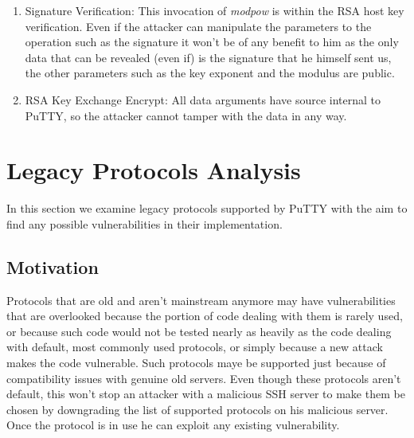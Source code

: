 \documentclass{bhamthesis}
\begin{document}
\begin{enumerate}
\begin{enumerate}
            \item{Signature Verification}: This invocation of \textit{modpow} is within the RSA host key verification. Even if the attacker can manipulate the parameters to the operation such as the signature it won't be of any benefit to him as the only data that can be revealed (even if) is the signature that he himself sent us, the other parameters such as the key exponent and the modulus are public.
            \item{RSA Key Exchange Encrypt}: All data arguments have source internal to PuTTY, so the attacker cannot tamper with the data in any way.
         \end{enumerate}   
\end{enumerate}    
\section{Legacy Protocols Analysis}
In this section we examine legacy protocols supported by PuTTY with the aim to find any possible vulnerabilities in their implementation.
\subsection{Motivation}
Protocols that are old and aren't mainstream anymore may have vulnerabilities that are overlooked because the portion of code dealing with them is rarely used, or because such code would not be tested nearly as heavily as the code dealing with default, most commonly used protocols, or simply because a new attack makes the code vulnerable. Such protocols maye be supported just because of compatibility issues with genuine old servers. Even though these protocols aren't default, this won't stop an attacker with a malicious SSH server to make them be chosen by downgrading the list of supported protocols on his malicious server. Once the protocol is in use he can exploit any existing vulnerability.
\clearpage
\end{document}

